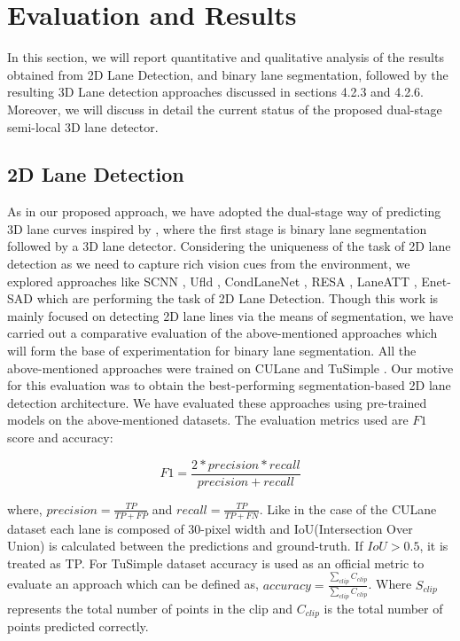 

    \chapter{Evaluation and Results}
    
    In this section, we will report quantitative and qualitative analysis of the results obtained from 2D Lane Detection, and binary lane segmentation, followed by the resulting 3D Lane detection approaches discussed in sections 4.2.3 and 4.2.6. Moreover, we will discuss in detail the current status of the proposed dual-stage semi-local 3D lane detector. 
    
    \section{2D Lane Detection}
    As in our proposed approach, we have adopted the dual-stage way of predicting 3D lane curves inspired by \cite{guo2020gen}, where the first stage is binary lane segmentation followed by a 3D lane detector. Considering the uniqueness of the task of 2D lane detection as we need to capture rich vision cues from the environment, we explored approaches like SCNN \cite{pan2018SCNN}, Ufld \cite{DBLP:journals/corr/abs-2004-11757}, CondLaneNet \cite{DBLP:journals/corr/abs-2105-05003}, RESA \cite{DBLP:journals/corr/abs-2008-13719},  LaneATT \cite{https://doi.org/10.48550/arxiv.2010.12035}, Enet-SAD \cite{DBLP:journals/corr/abs-1908-00821} which are performing the task of 2D Lane Detection. Though this work is mainly focused on detecting 2D lane lines via the means of segmentation, we have carried out a comparative evaluation of the above-mentioned approaches which will form the base of experimentation for binary lane segmentation. All the above-mentioned approaches were trained on  CULane \cite{pan2018SCNN} and TuSimple \cite{Tusimple}. Our motive for this evaluation was to obtain the best-performing segmentation-based 2D lane detection architecture. We have evaluated these approaches using pre-trained models on the above-mentioned datasets. The evaluation metrics used are $F1$ score and accuracy: 
    
    \begin{equation}
        F1 = \frac{2*precision * recall}{precision + recall}
    \end{equation}
    
where, $precision = \frac{TP}{TP + FP}$ and $recall = \frac{TP}{TP + FN}$. Like in the case of the CULane \cite{pan2018SCNN} dataset each lane is composed of 30-pixel width and IoU(Intersection Over Union) is calculated between the predictions and ground-truth. If $IoU > 0.5$, it is treated as TP. 
For TuSimple dataset accuracy is used as an official metric to evaluate an approach which can be defined as, $accuracy =\frac{\sum_{clip} C_{clip}}{ \sum_{clip} C_{clip}}$. Where $S_{clip}$ represents the total number of points in the clip and $C_{clip}$ is the total number of points predicted correctly. 

